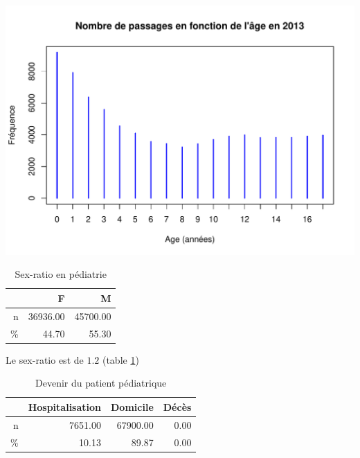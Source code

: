 \documentclass[12pt,english,french,twoside]{book}\usepackage[]{graphicx}\usepackage[]{color}
\makeatletter
\def\maxwidth{ %
  \ifdim\Gin@nat@width>\linewidth
    \linewidth
  \else
    \Gin@nat@width
  \fi
}
\newenvironment{knitrout}{}{} %
\makeatother
\begin{document}
\begin{knitrout}
\color{fgcolor}
\includegraphics[width=\maxwidth]{figure/passages_pediatrie} 

\end{knitrout}



\begin{table}[ht]
\centering
\begin{tabular}{rrr}
  \hline
 & F & M \\ 
  \hline
n & 36936.00 & 45700.00 \\ 
  \% & 44.70 & 55.30 \\ 
   \hline
\end{tabular}
\caption[Sex-ratio en pédiatrie]{Sex-ratio en pédiatrie} 
\label{tab:ped_sr}
\end{table}



Le sex-ratio est de $1.2$ (table \ref{tab:ped_sr})


\begin{table}[ht]
\centering
\begin{tabular}{rrrr}
  \hline
 & Hospitalisation & Domicile & Décès \\ 
  \hline
n & 7651.00 & 67900.00 & 0.00 \\ 
  \% & 10.13 & 89.87 & 0.00 \\ 
   \hline
\end{tabular}
\caption[Devenir du patient pédiatrique]{Devenir du patient pédiatrique} 
\label{tab:ped_hosp}
\end{table}
\end{document}
